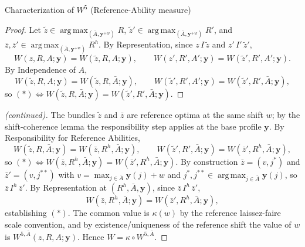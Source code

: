 \documentclass[10pt]{beamer}
\DeclareMathOperator*{\argmax}{arg\,max}
\begin{document}
\begin{frame}[allowframebreaks]{Characterization of $W^5$ (Reference-Ability measure)}
\begin{proof}
Let $\tilde z\in\argmax_{(\bar A,\mathbf y^{+w})}R$,
$\tilde z'\in\argmax_{(\bar A,\mathbf y^{+w})}R'$, and
$\bar z,\bar z'\in\argmax_{(\bar A,\mathbf y^{+w})}R^h$. By Representation, since
$z\,I\,\tilde z$ and $z'\,I'\,\tilde z'$,
\begin{equation*}
W(z,R,A;\mathbf y)=W(\tilde z,R,A;\mathbf y),\qquad
W(z',R',A';\mathbf y)=W(\tilde z',R',A';\mathbf y).
\end{equation*}
By Independence of $A$,
\begin{equation*}
W(\tilde z,R,A;\mathbf y)=W(\tilde z,R,\bar A;\mathbf y),\qquad
W(\tilde z',R',A';\mathbf y)=W(\tilde z',R',\bar A;\mathbf y),
\end{equation*}
so $(*)\Leftrightarrow W(\tilde z,R,\bar A;\mathbf y)=W(\tilde z',R',\bar
A;\mathbf y)$.
\end{proof}
\framebreak
\begin{proof}[(continued)]
The bundles $\tilde z$ and $\bar z$ are reference optima at the
same shift $w$; by the shift-coherence lemma the responsibility step applies at
the base profile $\mathbf y$. By Responsibility for Reference Abilities,
\begin{equation*}
W(\tilde z,R,\bar A;\mathbf y)=W(\bar z,R^h,\bar A;\mathbf y),\qquad
W(\tilde z',R',\bar A;\mathbf y)=W(\bar z',R^h,\bar A;\mathbf y),
\end{equation*}
so $(*)\Leftrightarrow W(\bar z,R^h,\bar A;\mathbf y)=W(\bar z',R^h,\bar
A;\mathbf y)$. By construction $\bar z=(v,j^*)$ and $\bar z'=(v,j^{**})$ with
$v=\max_{j\in\bar A}\mathbf y(j)+w$ and
$j^*,j^{**}\in\argmax_{j\in\bar A}\mathbf y(j)$, so $\bar z\,I^h\,\bar z'$.
By Representation at $(R^h,\bar A,\mathbf y)$, since $\bar z\,I^h\,\bar z'$,
\begin{equation*}
W(\bar z,R^h,\bar A;\mathbf y)=W(\bar z',R^h,\bar A;\mathbf y),
\end{equation*}
establishing $(*)$. The common value is $\kappa(w)$ by the reference
laissez-faire scale convention, and by existence/uniqueness of the reference
shift the value of $w$ is $W^{5,\bar A}(z,R,A;\mathbf y)$. Hence
$W=\kappa\circ W^{5,\bar A}$.
\end{proof}


\end{frame}
\end{document}
